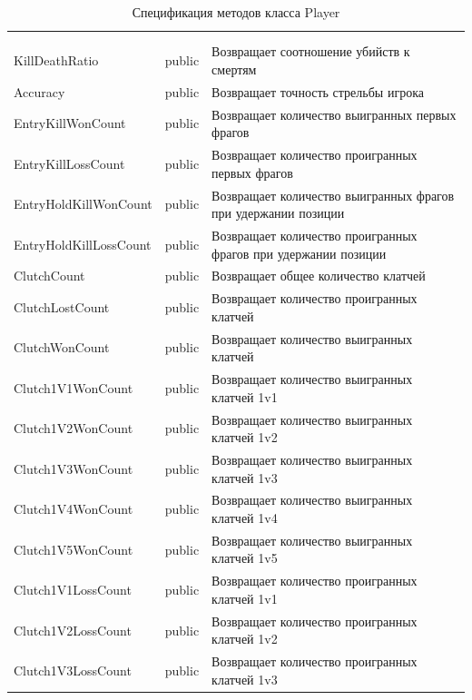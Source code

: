 \begin{xltabular}{\textwidth}{|X|X|X|}
	\caption{Спецификация методов класса Player}\label{table:PlayerMethods}\\ \hline
	 &  &  \\ \hline
	 &  &  \\ \hline
	\endfirsthead
	 \hline
	 &  &  \\ \hline
	\endhead
	KillDeathRatio & public & Возвращает соотношение убийств к смертям \\ \hline
	Accuracy & public & Возвращает точность стрельбы игрока \\ \hline
	EntryKillWonCount & public & Возвращает количество выигранных первых фрагов \\ \hline
	EntryKillLossCount & public & Возвращает количество проигранных первых фрагов \\ \hline
	EntryHoldKillWonCount & public & Возвращает количество выигранных фрагов при удержании позиции \\ \hline
	EntryHoldKillLossCount & public & Возвращает количество проигранных фрагов при удержании позиции \\ \hline
	ClutchCount & public & Возвращает общее количество клатчей \\ \hline
	ClutchLostCount & public & Возвращает количество проигранных клатчей \\ \hline
	ClutchWonCount & public & Возвращает количество выигранных клатчей \\ \hline
	Clutch1V1WonCount & public & Возвращает количество выигранных клатчей 1v1 \\ \hline
	Clutch1V2WonCount & public & Возвращает количество выигранных клатчей 1v2 \\ \hline
	Clutch1V3WonCount & public & Возвращает количество выигранных клатчей 1v3 \\ \hline
	Clutch1V4WonCount & public & Возвращает количество выигранных клатчей 1v4 \\ \hline
	Clutch1V5WonCount & public & Возвращает количество выигранных клатчей 1v5 \\ \hline
	Clutch1V1LossCount & public & Возвращает количество проигранных клатчей 1v1 \\ \hline
	Clutch1V2LossCount & public & Возвращает количество проигранных клатчей 1v2 \\ \hline
	Clutch1V3LossCount & public & Возвращает количество проигранных клатчей 1v3 \\ \hline

\end{xltabular}
